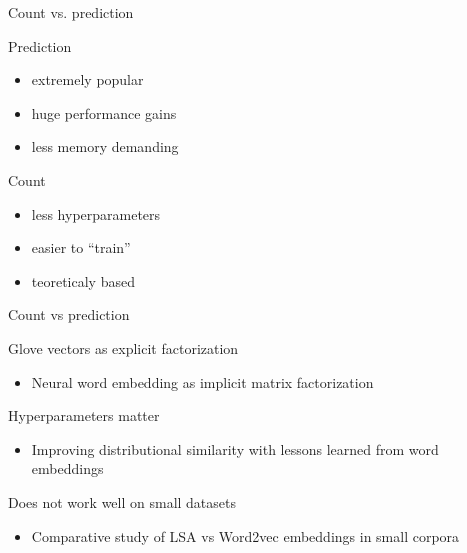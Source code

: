 \documentclass[xcolor={table}]{beamer}
\begin{document}
\begin{frame}{Count vs. prediction}
    \begin{block}{Prediction}
        \begin{itemize}
            \item extremely popular
            \item huge performance gains
            \item less memory demanding
        \end{itemize}
    \end{block}

    \begin{block}{Count}
        \begin{itemize}
            \item less hyperparameters
            \item easier to ``train''
            \item teoreticaly based
        \end{itemize}
    \end{block}
\end{frame} 

\begin{frame}{Count vs prediction}
    \begin{block}{Glove vectors as explicit factorization}
        \begin{itemize}
            \item Neural word embedding as implicit matrix factorization \cite{levy2014neural}
        \end{itemize}
    \end{block}

    \begin{block}{Hyperparameters matter}
        \begin{itemize}
            \item Improving distributional similarity with lessons learned from word embeddings \cite{levy2015improving}
        \end{itemize}
    \end{block}

    \begin{block}{Does not work well on small datasets}
        \begin{itemize}
            \item Comparative study of LSA vs Word2vec embeddings in small corpora \cite{altszyler2016comparative}
        \end{itemize}
    \end{block}
\end{frame} 
\end{document}
